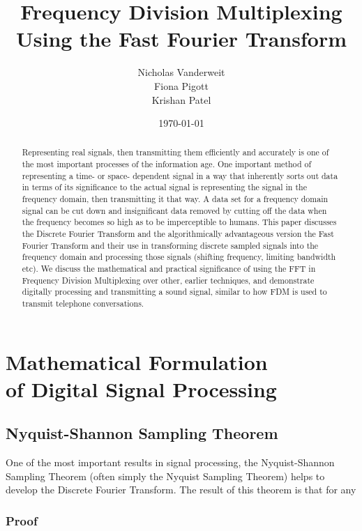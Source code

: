 \documentclass[12pt]{article}
\title{Frequency Division Multiplexing \\Using the Fast Fourier Transform }
\author{Nicholas Vanderweit \\Fiona Pigott \\Krishan Patel}
\date{\today}
\begin{document}
\maketitle


\begin{abstract}

Representing real signals, then transmitting them efficiently and accurately is one of the most important processes of the information age. One important method of representing a time- or space- dependent signal in a way that inherently sorts out data in terms of its significance to the actual signal is representing the signal in the frequency domain, then transmitting it that way. A data set for a frequency domain signal can be cut down and insignificant data removed by cutting off the data when the frequency becomes so high as to be imperceptible to humans.
This paper discusses the Discrete Fourier Transform and the algorithmically advantageous version the Fast Fourier Transform and their use in transforming discrete sampled signals into the frequency domain and processing those signals (shifting frequency, limiting bandwidth etc). We discuss the mathematical and practical significance of using the FFT in Frequency Division Multiplexing over other, earlier techniques, and demonstrate digitally processing and transmitting a sound signal, similar to how FDM is used to transmit telephone conversations.

\end{abstract}

\clearpage

\section{Mathematical Formulation \\of Digital Signal Processing}

\subsection{Nyquist-Shannon Sampling Theorem}

One of the most important results in signal processing, the Nyquist-Shannon Sampling Theorem (often simply the Nyquist Sampling Theorem) helps to develop the Discrete Fourier Transform. The result of this theorem is that for any 

\subsubsection{Proof}
\end{document}
